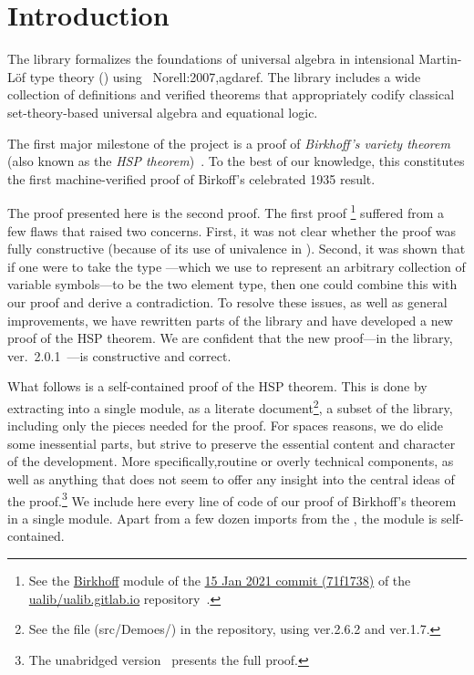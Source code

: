 \section{Introduction}
The \agdaalgebras library \cite{ualib_v2.0.1} formalizes the foundations of universal algebra
in intensional Martin-Löf type theory (\mltt) using \agda~{Norell:2007,agdaref}.
The library includes a wide collection of definitions and verified theorems that appropriately codify
classical set-theory-based universal algebra and equational
logic.

The first major milestone of the \agdaalgebras project is a proof of \emph{Birkhoff's
variety theorem} (also known as the \emph{HSP theorem})~\cite{Birkhoff:1935}.
To the best of our knowledge, this constitutes the first machine-verified proof of Birkoff's
celebrated 1935 result.

The proof presented here is the second proof. The first proof%
\footnote{See the
 \href{https://github.com/ualib/ualib.github.io/blob/71f173858701398d56224dd79d152c380c0c2b5e/src/lagda/UALib/Birkhoff.lagda}{Birkhoff}
 module of the
 \href{https://github.com/ualib/ualib.github.io/commit/71f173858701398d56224dd79d152c380c0c2b5e}{15
 Jan 2021  commit (71f1738)} of the
 \href{https://github.com/ualib/ualib.github.io}{ualib/ualib.gitlab.io}
 repository~\cite{ualib_v1.0.0}.}
suffered from a few flaws that raised two concerns. First, it was not clear whether the
proof was fully constructive (because of its use of univalence in \mltt). Second,
it was shown that if one were to take the type
---which we use to represent an arbitrary collection of
variable symbols---to be  the two element type, then one could combine this with our
proof and derive a contradiction. To resolve these issues, as well as general improvements,
we have rewritten parts of the library and have
developed a new proof of the HSP theorem. We are confident that the new
proof---in the \agdaalgebras library, ver.~2.0.1~\cite{ualib_v2.0.1}---is
constructive and correct.

What follows is a self-contained \agda proof of the HSP theorem.  This is done by
extracting into a single module, as a literate \agda document\footnote{See the file
(src/Demoes/\HSPlagda) in the repository, using \agda ver.2.6.2 and \agdastdlib ver.1.7.},
a subset of the \agdaalgebras library, including only
the pieces needed for the proof.
\ifshort
For spaces reasons, we do elide some inessential parts,
but strive to preserve the essential content and character of the development.
More specifically,routine or overly technical components, as well as anything that does not
seem to offer any insight into the central ideas of the proof.\footnote{The unabridged
version~\cite{DeMeo:2021} presents the full proof.}
\else
We include here every line of code of our proof of Birkhoff's theorem
in a single \agda module.  Apart from a few dozen imports from the \agdastdlib, the module
is self-contained.
\fi

